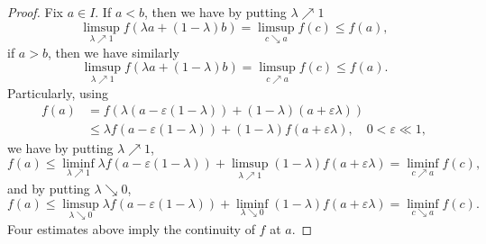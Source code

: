 \begin{proof}
	Fix $a\in I$.
	If $a<b$, then we have by putting $\lambda\nearrow1$
	\[
		\limsup_{\lambda\nearrow1}f(\lambda a + (1-\lambda)b) = \limsup_{c\searrow a}f(c)\leq f(a),
	\]
	if $a>b$, then we have similarly
	\[
		\limsup_{\lambda\nearrow1}f(\lambda a + (1-\lambda)b) = \limsup_{c\nearrow a}f(c)\leq f(a).
	\]
	Particularly, using
	\begin{align*}
		f(a) &= f(\lambda(a-\varepsilon(1-\lambda)) + (1-\lambda)(a+\varepsilon\lambda))\\
			&\leq \lambda f(a-\varepsilon(1-\lambda)) + (1-\lambda)f(a+\varepsilon\lambda),
			\quad 0<\varepsilon\ll 1,
	\end{align*}
	we have by putting $\lambda\nearrow1$,
	\[
		f(a)\leq \liminf_{\lambda\nearrow1}\lambda f(a-\varepsilon(1-\lambda)) 
			+ \limsup_{\lambda\nearrow1}(1-\lambda)f(a+\varepsilon\lambda)
			= \liminf_{c\nearrow a}f(c),
	\]
	and by putting $\lambda\searrow0$,
	\[
		f(a)\leq \limsup_{\lambda\searrow0}\lambda f(a-\varepsilon(1-\lambda)) 
			+ \liminf_{\lambda\searrow0}(1-\lambda)f(a+\varepsilon\lambda)
			= \liminf_{c\searrow a}f(c).
	\]	
	Four estimates above imply the continuity of $f$ at $a$.


\end{proof}
